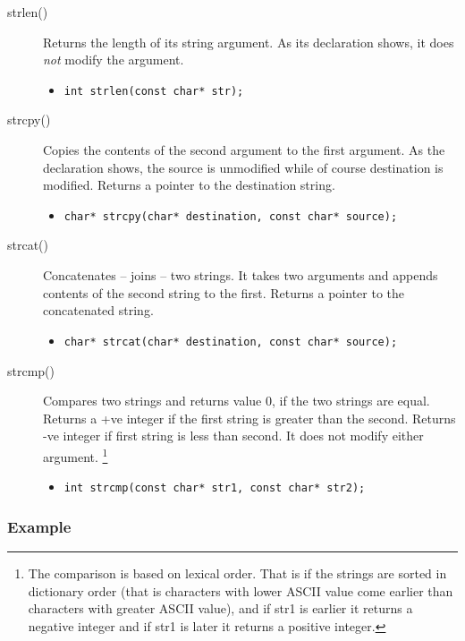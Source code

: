 \documentclass[11pt,a4paper]{article}
\begin{document}
\begin{description}
\item [strlen()] Returns the length of its string argument. As its declaration shows, it does \emph{not} modify the argument.

  \begin{itemize}
  \item \lstinline!int strlen(const char* str);! 
  \end{itemize}

\item [strcpy()] Copies the contents of the second argument to the first argument. As the declaration shows, the source is unmodified while of course destination is modified. Returns a pointer to the destination string.
  \begin{itemize}
    \item  \lstinline!char* strcpy(char* destination, const char* source);! 
  \end{itemize}

\item [strcat()] Concatenates -- joins -- two strings. It takes two arguments and appends contents of the second string to the first. Returns a pointer to the concatenated string.
  \begin{itemize}
    \item \lstinline!char* strcat(char* destination, const char* source);! 
  \end{itemize}

\item[strcmp()] Compares two strings and returns value 0, if the two strings are equal. Returns a +ve integer if the first string is greater than the second.  Returns -ve integer if first string is less than second. It does not modify either argument. \footnote{The comparison is based on lexical order. That is if the strings are sorted in dictionary order (that is characters with lower ASCII value come earlier than characters with greater ASCII value), and if str1 is earlier it returns a negative integer and if str1 is later it returns a positive integer.}  
  \begin{itemize}
    \item \lstinline!int strcmp(const char* str1, const char* str2);! 
  \end{itemize}
\end{description}

\subsubsection*{Example}
\end{document}
